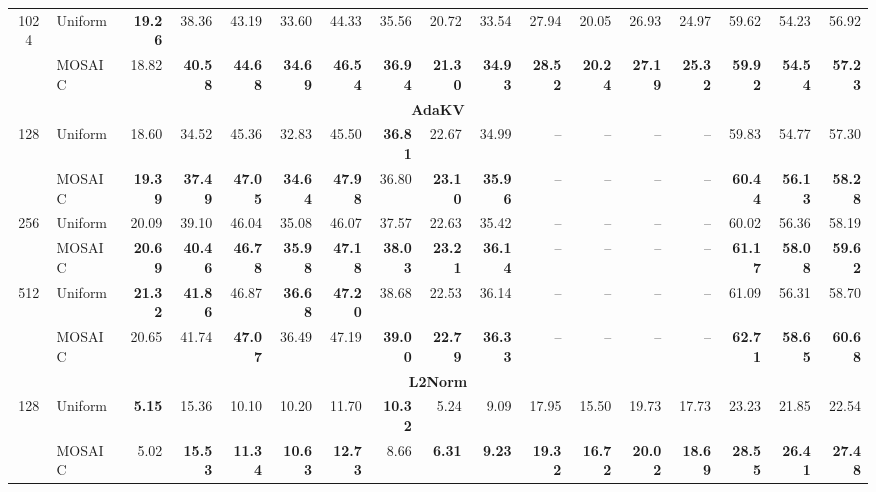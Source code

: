 \begin{table}[tp]
\begin{tabular}{@{} c l rrrr rrrr rrrr rrr @{}}
    \cmidrule(l){1-17}
    \multirow{2}{*}{1024} & Uniform & \textbf{19.26} & 38.36 & 43.19 & 33.60 & 44.33 & 35.56 & 20.72 & 33.54 & 27.94 & 20.05 & 26.93 & 24.97 & 59.62 & 54.23 & 56.92 \\
     & MOSAIC & 18.82 & \textbf{40.58} & \textbf{44.68} & \textbf{34.69} & \textbf{46.54} & \textbf{36.94} & \textbf{21.30} & \textbf{34.93} & \textbf{28.52} & \textbf{20.24} & \textbf{27.19} & \textbf{25.32} & \textbf{59.92} & \textbf{54.54} & \textbf{57.23} \\
    \midrule
    \multicolumn{17}{c}{\textbf{AdaKV}} \\
    \midrule
    \multirow{2}{*}{128} & Uniform & 18.60 & 34.52 & 45.36 & 32.83 & 45.50 & \textbf{36.81} & 22.67 & 34.99 & -- & -- & -- & -- & 59.83 & 54.77 & 57.30 \\
     & MOSAIC & \textbf{19.39} & \textbf{37.49} & \textbf{47.05} & \textbf{34.64} & \textbf{47.98} & 36.80 & \textbf{23.10} & \textbf{35.96} & -- & -- & -- & -- & \textbf{60.44} & \textbf{56.13} & \textbf{58.28} \\
    \cmidrule(l){1-17}
    \multirow{2}{*}{256} & Uniform & 20.09 & 39.10 & 46.04 & 35.08 & 46.07 & 37.57 & 22.63 & 35.42 & -- & -- & -- & -- & 60.02 & 56.36 & 58.19 \\
     & MOSAIC & \textbf{20.69} & \textbf{40.46} & \textbf{46.78} & \textbf{35.98} & \textbf{47.18} & \textbf{38.03} & \textbf{23.21} & \textbf{36.14} & -- & -- & -- & -- & \textbf{61.17} & \textbf{58.08} & \textbf{59.62} \\
    \cmidrule(l){1-17}
    \multirow{2}{*}{512} & Uniform & \textbf{21.32} & \textbf{41.86} & 46.87 & \textbf{36.68} & \textbf{47.20} & 38.68 & 22.53 & 36.14 & -- & -- & -- & -- & 61.09 & 56.31 & 58.70 \\
     & MOSAIC & 20.65 & 41.74 & \textbf{47.07} & 36.49 & 47.19 & \textbf{39.00} & \textbf{22.79} & \textbf{36.33} & -- & -- & -- & -- & \textbf{62.71} & \textbf{58.65} & \textbf{60.68} \\
    \midrule
    \multicolumn{17}{c}{\textbf{L2Norm}} \\
    \midrule
    \multirow{2}{*}{128} & Uniform & \textbf{5.15} & 15.36 & 10.10 & 10.20 & 11.70 & \textbf{10.32} & 5.24 & 9.09 & 17.95 & 15.50 & 19.73 & 17.73 & 23.23 & 21.85 & 22.54 \\
     & MOSAIC & 5.02 & \textbf{15.53} & \textbf{11.34} & \textbf{10.63} & \textbf{12.73} & 8.66 & \textbf{6.31} & \textbf{9.23} & \textbf{19.32} & \textbf{16.72} & \textbf{20.02} & \textbf{18.69} & \textbf{28.55} & \textbf{26.41} & \textbf{27.48} \\

\end{tabular}
\end{table}
